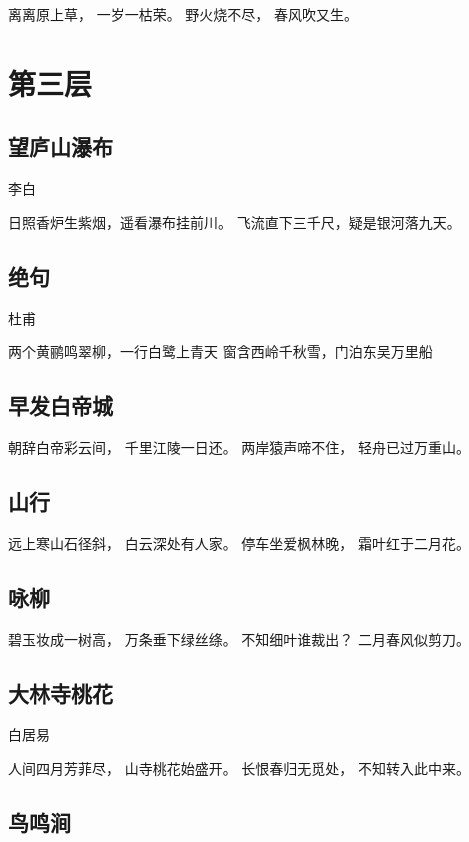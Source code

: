 \documentclass[12pt,UTF8]{ctexbook}
\begin{document}
离离原上草，
一岁一枯荣。
野火烧不尽，
春风吹又生。

\chapter{第三层}

\section{望庐山瀑布}

李白

日照香炉生紫烟，遥看瀑布挂前川。
飞流直下三千尺，疑是银河落九天。

\section{绝句}

杜甫

两个黄鹂鸣翠柳，一行白鹭上青天
窗含西岭千秋雪，门泊东吴万里船

\section{早发白帝城}

朝辞白帝彩云间，
千里江陵一日还。
两岸猿声啼不住，
轻舟已过万重山。

\section{山行}

远上寒山石径斜，
白云深处有人家。
停车坐爱枫林晚，
霜叶红于二月花。

\section{咏柳}

碧玉妆成一树高，
万条垂下绿丝绦。
不知细叶谁裁出？
二月春风似剪刀。

\section{大林寺桃花}

白居易

人间四月芳菲尽，
山寺桃花始盛开。
长恨春归无觅处，
不知转入此中来。

\section{鸟鸣涧}
\end{document}
